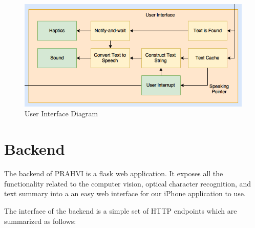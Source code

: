 \begin{figure}
	\centering
	\includegraphics[scale = 0.6]{PRAHVI-UI.png}
	\caption{User Interface Diagram}
	\label{uiDiagram}
\end{figure}

\section{Backend}
The backend of PRAHVI is a flask web application. It exposes all the functionality related to the computer vision, optical character recognition, and text summary into a an easy web interface for our iPhone application to use.

The interface of the backend is a simple set of HTTP endpoints which are summarized as follows:

